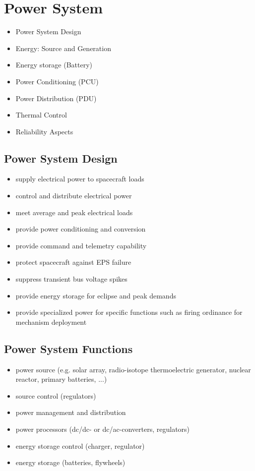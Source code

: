 \section{Power System}
\begin{itemize}
 \item Power System Design
 \item Energy: Source and Generation
 \item Energy storage (Battery)
 \item Power Conditioning (PCU)
 \item Power Distribution (PDU)
 \item Thermal Control
 \item Reliability Aspects
\end{itemize}
\subsection{Power System Design}
\begin{itemize}
 \item supply electrical power to spacecraft loads
 \item control and distribute electrical power
 \item meet average and peak electrical loads
 \item provide power conditioning and conversion
 \item provide command and telemetry capability
 \item protect spacecraft against EPS failure
 \item suppress transient bus voltage spikes
 \item provide energy storage for eclipse and peak demands
 \item provide specialized power for specific functions such as firing ordinance for mechanism deployment
\end{itemize}
\subsection{Power System Functions}
\begin{itemize}
 \item power source (e.g. solar array, radio-isotope thermoelectric generator, nuclear reactor, primary batteries, ...)
 \item source control (regulators)
 \item power management and distribution
 \item power processors (dc/dc- or dc/ac-converters, regulators)
 \item energy storage control (charger, regulator)
 \item energy storage (batteries, flywheels)
\end{itemize}

